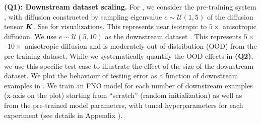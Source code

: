\medskip
\noindent \textbf{(Q1): Downstream dataset scaling.} 
For \sysA{}, we consider the pre-training system \sysAonefive{}, with diffusion constructed by sampling eigenvalue $e \sim \mathcal{U}(1, 5)$ of the diffusion tensor $\boldsymbol{K}$.
See  for visualizations.
This represents near isotropic to $5\times$ anisotropic diffusion.
We use $e \sim \mathcal{U}(5, 10)$ as the downstream dataset \sysAfiveten{}.
This represents $5\times$--$10\times$ anisotropic diffusion and is moderately out-of-distribution (OOD) from the pre-training dataset. 
While we systematically quantify the OOD effects in \textbf{(Q2)}, we use this specific
test-case to illustrate the effect of the size of the downstream dataset. %
%
We plot the behaviour of testing error as a function of
downstream examples in . We train
an FNO model for each number of downstream examples (x-axis on the plot)
starting from ``scratch'' (random initialization) as well as from the
pre-trained model parameters, with tuned hyperparameters for each experiment (see details in Appendix ).


